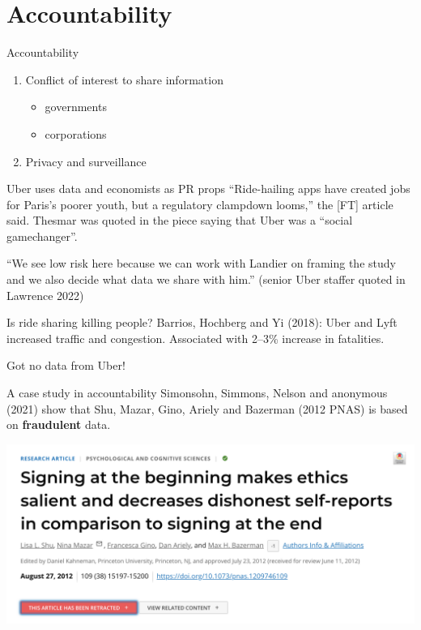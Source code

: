 \documentclass[
  ignorenonframetext,
  aspectratio=1610,
]{beamer}
\providecommand{\tightlist}{%
  \setlength{\itemsep}{0pt}\setlength{\parskip}{0pt}}
\begin{document}
\hypertarget{accountability}{%
\section{Accountability}\label{accountability}}

\begin{frame}{Accountability}
\protect\hypertarget{accountability-1}{}
\begin{enumerate}
\tightlist
\item
  Conflict of interest to share information

  \begin{itemize}
  \tightlist
  \item
    governments
  \item
    corporations
  \end{itemize}
\item
  Privacy and surveillance
\end{enumerate}
\end{frame}

\begin{frame}{Uber uses data and economists as PR props}
\protect\hypertarget{uber-uses-data-and-economists-as-pr-props}{}
``Ride-hailing apps have created jobs for Paris's poorer youth, but a
regulatory clampdown looms,'' the {[}FT{]} article said. Thesmar was
quoted in the piece saying that Uber was a ``social gamechanger''.

``We see low risk here because we can work with Landier on framing the
study and we also decide what data we share with him.'' (senior Uber
staffer quoted in Lawrence 2022)
\end{frame}

\begin{frame}{Is ride sharing killing people?}
\protect\hypertarget{is-ride-sharing-killing-people}{}
Barrios, Hochberg and Yi (2018): Uber and Lyft increased traffic and
congestion. Associated with 2--3\% increase in fatalities.

Got no data from Uber!
\end{frame}

\begin{frame}{A case study in accountability}
\protect\hypertarget{a-case-study-in-accountability}{}
Simonsohn, Simmons, Nelson and anonymous (2021) show that Shu, Mazar,
Gino, Ariely and Bazerman (2012 PNAS) is based on \textbf{fraudulent}
data.

\includegraphics{exhibit/ariely.png}
\end{frame}
\end{document}
